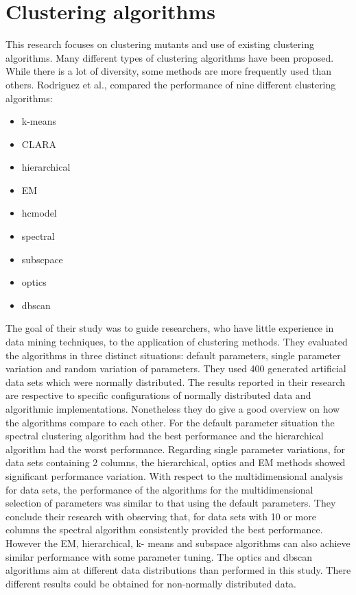 \documentclass[../main]{subfiles}
\begin{document}
\section{Clustering algorithms}
This research focuses on clustering mutants and use of existing clustering algorithms. 
Many different types of clustering algorithms have been proposed\cite{Rodriguez2019}. While there is a lot of diversity, some methods are more frequently used than others\cite{Wu2008TopMining}. 
Rodriguez et al., compared the performance of nine different clustering algorithms:
\begin{itemize}
    \item k-means
    \item CLARA
    \item hierarchical
    \item EM
    \item hcmodel
    \item spectral
    \item subscpace
    \item optics
    \item dbscan
\end{itemize}
The goal of their study was to guide researchers, who have little experience in data mining techniques, to the application of clustering methods.
They evaluated the algorithms in three distinct situations: default parameters, single parameter variation and random variation of parameters.
They used 400 generated artificial data sets which were normally distributed.
\newline
The results reported in their research are respective to specific configurations of normally distributed data and algorithmic implementations.
Nonetheless they do give a good overview on how the algorithms compare to each other.
\newline
For the default parameter situation the spectral clustering algorithm had the best performance and the hierarchical algorithm had the worst performance.
\newline
Regarding single parameter variations, for data sets containing 2 columns, the hierarchical, optics and EM methods showed significant performance variation.
\newline
With respect to the multidimensional analysis for data sets, the performance of the algorithms for the multidimensional selection of parameters was similar to that using the default parameters.
They conclude their research with observing that, for data sets with 10 or more columns the spectral algorithm consistently provided the best performance.
However the EM, hierarchical, k- means and subspace algorithms can also achieve similar performance with some parameter tuning.
The optics and dbscan algorithms aim at different data distributions than performed in this study. There different results could be obtained for non-normally distributed data.
\end{document}
